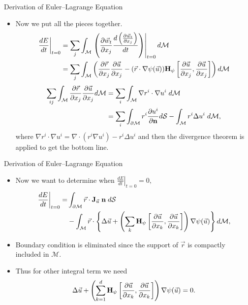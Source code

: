\documentclass{beamer}
\begin{document}
\begin{frame}{Derivation of Euler--Lagrange Equation}
  \begin{itemize}
\item Now we put all the pieces together. 
\begin{align*}
\left.\frac{d E}{d t} \right\vert_{t=0} &= \sum_{j} \int_{\mathcal{M}} \left.\left( \frac{\partial \vec{w}_t}{\partial x_j} \frac{d\left(\frac{\partial \vec{w}_t}{\partial x_j}\right)}{d t} \right) \right\vert_{t=0} d\mathcal{M} \\
& = \sum_{j} \int_{\mathcal{M}} \left( \frac{\partial \vec{r}}{\partial x_j}\frac{\partial \vec{u}}{\partial x_j}- (\vec{r}\cdot \nabla \psi(\vec{u}) ) {\bf H}_{\psi} \left[\frac{\partial \vec{u}}{\partial x_j} ,\frac{\partial \vec{u}}{\partial x_j} \right] \right) d \mathcal{M}
\end{align*}
\begin{align*}
\sum_{ij} \int_{\mathcal{M}} \frac{\partial \vec{r}}{\partial x_j}\frac{\partial \vec{u}}{\partial x_j} d \mathcal{M} &= \sum_i \int_{\mathcal{M}} \nabla r^i \cdot \nabla u^i \hspace{0.1cm}d \mathcal{M}\\
 & = \sum_i \int_{\partial \mathcal{M}} r^i \frac{\partial u^i}{\partial {\bf n}} d \mathcal{S} - \int_{\mathcal{M}} r^i \Delta u^i\hspace{0.1cm} d\mathcal{M},
\end{align*}
where $\nabla r^i \cdot \nabla u^i = \nabla \cdot (r^i \nabla u^i) - r^i \Delta u^i$ and then the divergence theorem is applied to get the bottom line.
  \end{itemize}
\end{frame}

\begin{frame}{Derivation of Euler--Lagrange Equation}
  \begin{itemize}
\item Now we want to determine when $\left.\frac{d E}{d t} \right\vert_{t=0}=0,$
\begin{align*}
 \left.\frac{d E}{d t} \right\vert_{t=0} =&\int_{\partial \mathcal{M}} \vec{r}\cdot {\bf J}_{\vec{u}}{\bf \; n}\; d \mathcal{S} \\
 &- \int_{\mathcal{M}} \vec{r}\cdot \left\lbrace \Delta \vec{u} + \left( \sum_{k} {\bf H}_{\psi} \left[ \frac{\partial \vec{u}}{\partial x_k},\frac{\partial \vec{u}}{\partial x_k}\right] \right) \nabla \psi (\vec{u}) \right\rbrace d\mathcal{M},
\end{align*}
\item Boundary condition is eliminated since the support of $\vec{r}$ is compactly included in $\mathcal{M}.$
\item Thus for other integral term we need
\begin{equation*}
\Delta \vec{u} + \left( \sum_{k=1}^d {\bf H}_{\psi} \left[\frac{\partial \vec{u}}{\partial x_k} ,\frac{\partial \vec{u}}{\partial x_k}\right] \right) \nabla \psi(\vec{u}) =0.
\end{equation*}
  \end{itemize}
\end{frame}
\end{document}
